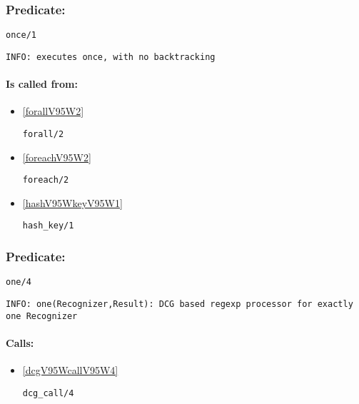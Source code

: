 \subsubsection{Predicate:} \label{onceV95W1}

\begin{verbatim}
once/1
\end{verbatim}

{\small \begin{verbatim}
INFO: executes once, with no backtracking

\end{verbatim}}
\paragraph{Is called from:} 
\begin{itemize}
\item \ref{forallV95W2} 
\begin{verbatim}
forall/2
\end{verbatim}

\item \ref{foreachV95W2} 
\begin{verbatim}
foreach/2
\end{verbatim}

\item \ref{hashV95WkeyV95W1} 
\begin{verbatim}
hash_key/1
\end{verbatim}

\end{itemize}

\subsubsection{Predicate:} \label{oneV95W4}

\begin{verbatim}
one/4
\end{verbatim}

{\small \begin{verbatim}
INFO: one(Recognizer,Result): DCG based regexp processor for exactly one Recognizer

\end{verbatim}}
\paragraph{Calls:} 
\begin{itemize}
\item \ref{dcgV95WcallV95W4} 
\begin{verbatim}
dcg_call/4
\end{verbatim}

\end{itemize}

